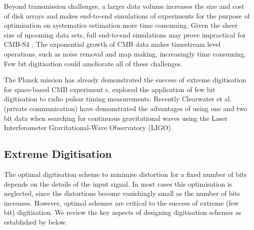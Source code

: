 \documentclass[apj]{emulateapj}
\begin{document}


Beyond transmission challenges, a larger data volume increases the size and cost of disk arrays and makes end-to-end simulations of experiments for the purpose of optimisation on systematics estimation more time consuming. Given the sheer size of upcoming data sets, full end-to-end simulations may prove impractical for CMB-S4 \citep{s4sciencebook}. The exponential growth of CMB data makes timestream level operations, such as noise removal and map making, increasingly time consuming. Few bit digitisation could ameliorate all of these challenges.



The Planck mission has already demonstrated the success of extreme digitisation for space-based CMB experiment s\citep{maris2003}. \cite{jenet1998} explored the application of few bit digitisation to radio pulsar timing measurements. Recently Clearwater et al. (private communication) have demonstrated the advantages of using one and two bit data when searching for continuous gravitational waves using the Laser Interferometer Gravitational-Wave Observatory (LIGO).


\subsection{Extreme Digitisation}
\label{subsec:extremedigitisation}

The optimal digitisation scheme to minimise distortion for a fixed number of bits depends on the details of the input signal. In most cases this optimisation is neglected, since the distortions become vanishingly small as the number of bits increases. However, optimal schemes are critical to the success of extreme (few bit) digitisation. We review the key aspects of designing digitisation schemes as established by \cite{max1960} below.
\end{document}
